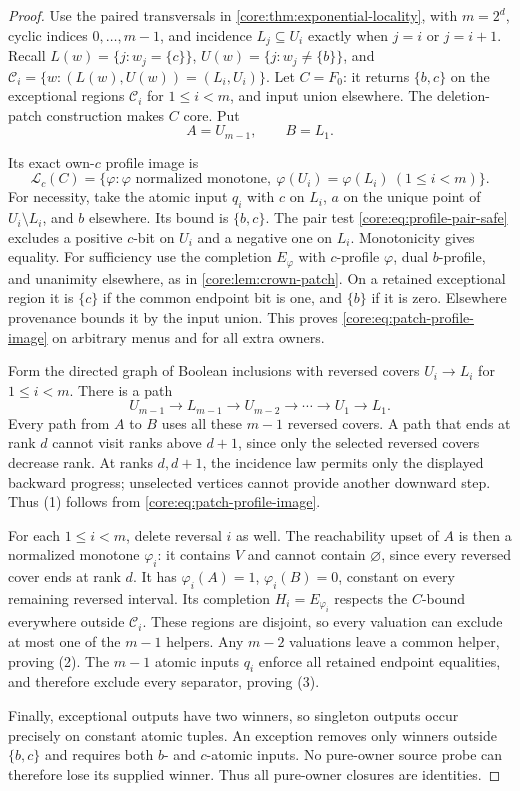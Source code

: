 \begin{proof}
Use the paired transversals in \cref{core:thm:exponential-locality},
with $m=2^d$, cyclic indices $0,\ldots,m-1$, and incidence
$L_j\subseteq U_i$ exactly when $j=i$ or $j=i+1$.
Recall $L(w)=\{j:w_j=\{c\}\}$, $U(w)=\{j:w_j\ne\{b\}\}$,
and $\mathcal C_i=\{w:(L(w),U(w))=(L_i,U_i)\}$.
Let $C=F_0$: it returns $\{b,c\}$ on the exceptional regions
$\mathcal C_i$ for $1\leq i<m$, and input union elsewhere.
The deletion-patch construction makes $C$ core. Put
\[
 A=U_{m-1},\qquad B=L_1.
\]

Its exact own-$c$ profile image is
\begin{equation}\label{core:eq:patch-profile-image}
 \mathcal L_c(C)=
 \{\varphi:\varphi\text{ normalized monotone},\
       \varphi(U_i)=\varphi(L_i)\ (1\leq i<m)\}.
\end{equation}
For necessity, take the atomic input $q_i$ with $c$ on $L_i$, $a$ on
the unique point of $U_i\setminus L_i$, and $b$ elsewhere.
Its bound is $\{b,c\}$. The pair test
\eqref{core:eq:profile-pair-safe} excludes a positive $c$-bit on $U_i$
and a negative one on $L_i$. Monotonicity gives equality.
For sufficiency use the completion $E_\varphi$ with $c$-profile
$\varphi$, dual $b$-profile, and unanimity elsewhere, as in
\cref{core:lem:crown-patch}. On a retained exceptional region it is
$\{c\}$ if the common endpoint bit is one, and $\{b\}$ if it is zero.
Elsewhere provenance bounds it by the input union. This proves
\eqref{core:eq:patch-profile-image} on arbitrary menus and for all extra
owners.

Form the directed graph of Boolean inclusions with reversed covers
$U_i\to L_i$ for $1\leq i<m$. There is a path
\[
 U_{m-1}\longrightarrow L_{m-1}\longrightarrow U_{m-2}
 \longrightarrow\cdots\longrightarrow U_1\longrightarrow L_1.
\]
Every path from $A$ to $B$ uses all these $m-1$ reversed covers.
A path that ends at rank $d$ cannot visit ranks above $d+1$, since
only the selected reversed covers decrease rank. At ranks $d,d+1$,
the incidence law permits only the displayed backward progress;
unselected vertices cannot provide another downward step.
Thus (1) follows from \eqref{core:eq:patch-profile-image}.

For each $1\leq i<m$, delete reversal $i$ as well. The reachability
upset of $A$ is then a normalized monotone $\varphi_i$: it contains
$V$ and cannot contain $\varnothing$, since every reversed cover ends
at rank $d$. It has
$\varphi_i(A)=1$, $\varphi_i(B)=0$, constant on every remaining
reversed interval. Its completion $H_i=E_{\varphi_i}$ respects the
$C$-bound everywhere outside $\mathcal C_i$. These regions are disjoint,
so every valuation can exclude at most one of the $m-1$ helpers.
Any $m-2$ valuations leave a common helper, proving (2).
The $m-1$ atomic inputs $q_i$ enforce all retained endpoint equalities,
and therefore exclude every separator, proving (3).

Finally, exceptional outputs have two winners, so singleton outputs
occur precisely on constant atomic tuples. An exception removes only
winners outside $\{b,c\}$ and requires both $b$- and $c$-atomic inputs.
No pure-owner source probe can therefore lose its supplied winner.
Thus all pure-owner closures are identities.
\end{proof}
